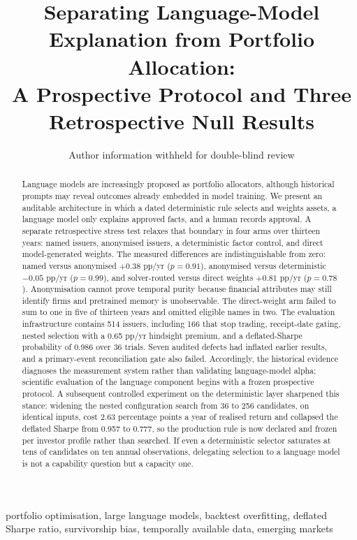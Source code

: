 \documentclass[10pt,conference]{IEEEtran}
\title{Separating Language-Model Explanation from Portfolio Allocation:\\A Prospective Protocol and Three Retrospective Null Results}
\author{Author information withheld for double-blind review}
\begin{document}
\maketitle

\begin{abstract}
Language models are increasingly proposed as portfolio allocators, although historical prompts may reveal outcomes already embedded in model training. We present an auditable architecture in which a dated deterministic rule selects and weights assets, a language model only explains approved facts, and a human records approval. A separate retrospective stress test relaxes that boundary in four arms over thirteen years: named issuers, anonymised issuers, a deterministic factor control, and direct model-generated weights. The measured differences are indistinguishable from zero: named versus anonymised $+0.38$ pp/yr ($p=0.91$), anonymised versus deterministic $-0.05$ pp/yr ($p=0.99$), and solver-routed versus direct weights $+0.81$ pp/yr ($p=0.78$). Anonymisation cannot prove temporal purity because financial attributes may still identify firms and pretrained memory is unobservable. The direct-weight arm failed to sum to one in five of thirteen years and omitted eligible names in two. The evaluation infrastructure contains 514 issuers, including 166 that stop trading, receipt-date gating, nested selection with a 0.65 pp/yr hindsight premium, and a deflated-Sharpe probability of 0.986 over 36 trials. Seven audited defects had inflated earlier results, and a primary-event reconciliation gate also failed. Accordingly, the historical evidence diagnoses the measurement system rather than validating language-model alpha; scientific evaluation of the language component begins with a frozen prospective protocol. A subsequent controlled experiment on the deterministic layer sharpened this stance: widening the nested configuration search from 36 to 256 candidates, on identical inputs, cost 2.63 percentage points a year of realised return and collapsed the deflated Sharpe from 0.957 to 0.777, so the production rule is now declared and frozen per investor profile rather than searched. If even a deterministic selector saturates at tens of candidates on ten annual observations, delegating selection to a language model is not a capability question but a capacity one.
\end{abstract}

\begin{IEEEkeywords}
portfolio optimisation, large language models, backtest overfitting, deflated Sharpe ratio, survivorship bias, temporally available data, emerging markets
\end{IEEEkeywords}
\end{document}
